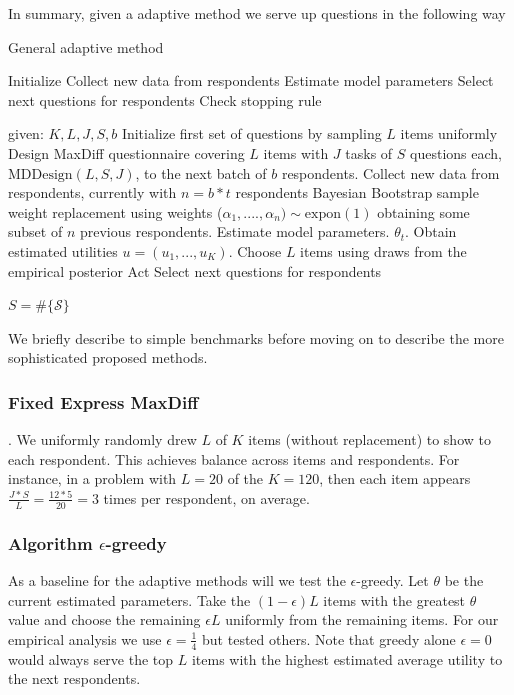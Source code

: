 \documentclass[nonblindrev]{informs3}
\begin{document}
In summary, given a adaptive method we serve up questions in the following way

\begin{algorithm}
\caption{General adaptive method} \label{alg:general}
\begin{algorithmic}[1]
\State Initialize 
\State
\State Collect new data from respondents
\State Estimate model parameters
\State Select next questions for respondents
\State Check stopping rule
\end{algorithmic}
\end{algorithm}



\begin{algorithm}
\label{Adaptive MaxDiff Thompson Sampling: TS}
\begin{algorithmic}[1]
\State given: $K,L,J,S,b$
\State Initialize first set of questions by sampling $L$ items uniformly
\State Design MaxDiff questionnaire covering $L$ items with $J$ tasks of $S$ questions each, $\text{MDDesign}(L,S,J)$, to the next batch of $b$ respondents.
\State Collect new data from respondents, currently with $n = b*t$ respondents
\State Bayesian Bootstrap sample weight replacement using weights ($\alpha_1, ...., \alpha_n)\sim \text{expon}(1)$ obtaining some subset of $n$ previous respondents.
\State Estimate model parameters. $\theta_t$. Obtain estimated utilities $u = (u_1,...,u_K)$.
\State Choose $L$ items using draws from the empirical posterior
\State Act Select next questions for respondents
\end{algorithmic}
\end{algorithm}

$S=\#\{\mathcal{S}\}$


We briefly describe to simple benchmarks before moving on to describe the more sophisticated proposed methods. 

\subsubsection{Fixed Express MaxDiff}. We uniformly randomly drew $L$ of $K$ items (without replacement) to show to each respondent.  This achieves balance across items and respondents. For instance, in a problem with $L=20$ of the $K=120$, then each item appears $\frac{J*S}{L} = \frac{12*5}{20} = 3$ times per respondent, on average.

\subsubsection{Algorithm $\epsilon$-greedy}
As a baseline for the adaptive methods will we test the $\epsilon$-greedy. Let $\theta$ be the current estimated parameters. Take the $(1-\epsilon)L$ items with the greatest $\theta$ value and choose the remaining $\epsilon L$ uniformly from the remaining items. For our empirical analysis we use $\epsilon=\frac{1}{4}$ but tested others. Note that greedy alone $\epsilon=0$ would always serve the top $L$ items with the highest estimated average utility to the next respondents.
\end{document}
